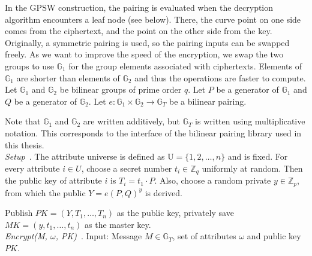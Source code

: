 In the GPSW construction, the pairing is evaluated when the decryption algorithm encounters a leaf node (see below).
There, the curve point on one side comes from the ciphertext, and the point on the other side from the key.
Originally, a symmetric pairing is used, so the pairing inputs can be swapped freely.
As we want to improve the speed of the encryption, we swap the two groups to use $\mathbb{G}_1$ for the group elements associated with ciphertexts.
Elements of $\mathbb{G}_1$ are shorter than elements of $\mathbb{G}_2$ and thus the operations are faster to compute.
\\



Let $\mathbb{G}_1$ and $\mathbb{G}_2$ be bilinear groups of prime order $q$.
Let $P$ be a generator of $\mathbb{G}_1$ and $Q$ be a generator of $\mathbb{G}_2$.
Let $e: \mathbb{G}_1 \times \mathbb{G}_2 \rightarrow \mathbb{G}_T$ be a bilinear pairing.

Note that $\mathbb{G}_1$ and $\mathbb{G}_2$ are written additively, but $\mathbb{G}_T$ is written using multiplicative notation.
This corresponds to the interface of the bilinear pairing library used in this thesis.\\

\noindent \emph{Setup}~\cite{goyal_attribute-based_2006}.
The attribute universe is defined as $\text{U} = \{1, 2, \dots, n\}$ and is fixed.
For every attribute $i \in U$, choose a secret number $t_i \in \mathbb{Z}_q$ uniformly at random.
Then the public key of attribute $i$ is $T_i = t_1 \cdot P$.
Also, choose a random private $y \in \mathbb{Z}_p$, from which the public $Y = e(P, Q)^y$ is derived.

Publish $PK=(Y, T_1, \dots, T_n)$ as the public key, privately save $MK = (y, t_1, \dots, t_n)$ as the master key.
\\

\noindent \emph{Encrypt(M, $\omega$, PK)}~\cite{goyal_attribute-based_2006}.
Input: Message $M \in \mathbb{G}_T$, set of \glspl{attribute} $\omega$ and public key $PK$. 

